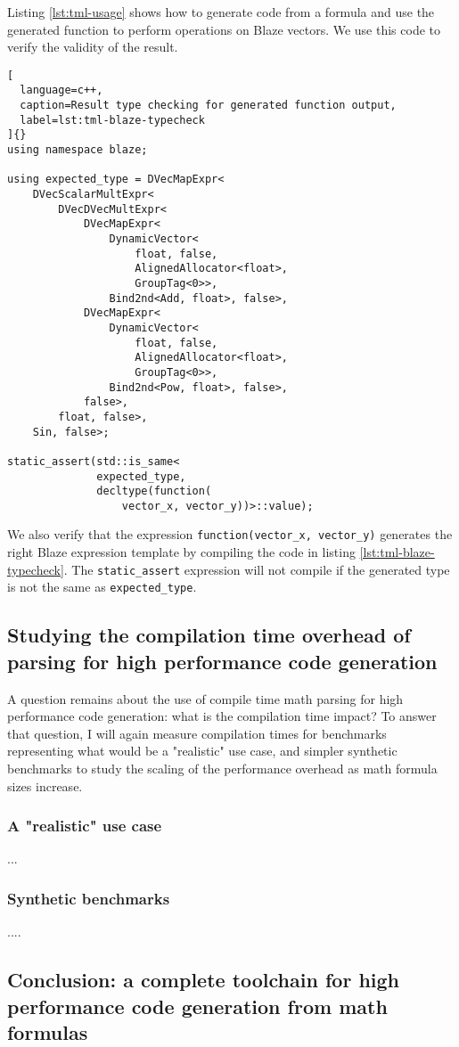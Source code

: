 \documentclass[../main]{subfiles}
\begin{document}
Listing \ref{lst:tml-usage} shows how to generate code from a formula
and use the generated function to perform operations on Blaze vectors.
We use this code to verify the validity of the result.

\begin{lstlisting}[
  language=c++,
  caption=Result type checking for generated function output,
  label=lst:tml-blaze-typecheck
]{}
using namespace blaze;

using expected_type = DVecMapExpr<
    DVecScalarMultExpr<
        DVecDVecMultExpr<
            DVecMapExpr<
                DynamicVector<
                    float, false,
                    AlignedAllocator<float>,
                    GroupTag<0>>,
                Bind2nd<Add, float>, false>,
            DVecMapExpr<
                DynamicVector<
                    float, false,
                    AlignedAllocator<float>,
                    GroupTag<0>>,
                Bind2nd<Pow, float>, false>,
            false>,
        float, false>,
    Sin, false>;

static_assert(std::is_same<
              expected_type,
              decltype(function(
                  vector_x, vector_y))>::value);
\end{lstlisting}

We also verify that the expression \lstinline{function(vector_x, vector_y)}
generates the right Blaze expression template by compiling the code in
listing \ref{lst:tml-blaze-typecheck}. The \lstinline{static_assert}
expression will not compile if the generated type is not the same as
\lstinline{expected_type}.

\subsection{
  Studying the compilation time overhead of parsing
  for high performance code generation
}

A question remains about the use of compile time math parsing
for high performance code generation: what is the compilation time impact?
To answer that question, I will again measure compilation times for benchmarks
representing what would be a "realistic" use case, and simpler synthetic
benchmarks to study the scaling of the performance overhead as math formula
sizes increase.

\subsubsection{
  A "realistic" use case
}

...

\subsubsection{
  Synthetic benchmarks
}

....

\subsection{
  Conclusion: a complete toolchain for high performance code generation
  from math formulas
}
\end{document}
